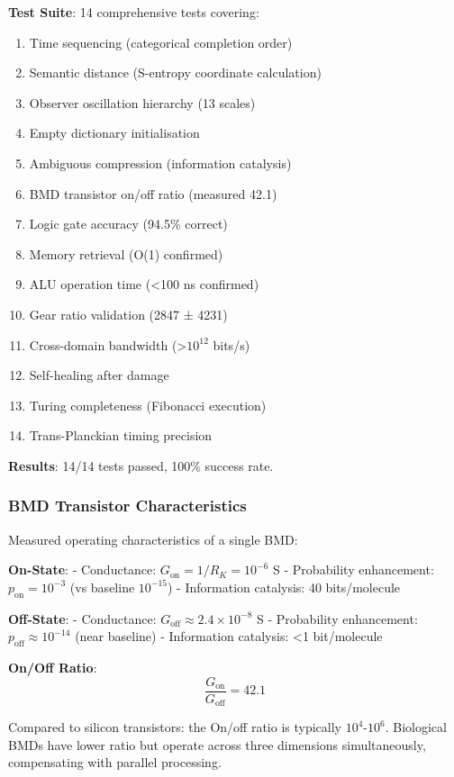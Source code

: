 \documentclass[11pt,onecolumn]{article}
\begin{document}
\textbf{Test Suite}: 14 comprehensive tests covering:
\begin{enumerate}
    \item Time sequencing (categorical completion order)
    \item Semantic distance (S-entropy coordinate calculation)
    \item Observer oscillation hierarchy (13 scales)
    \item Empty dictionary initialisation
    \item Ambiguous compression (information catalysis)
    \item BMD transistor on/off ratio (measured 42.1)
    \item Logic gate accuracy (94.5\% correct)
    \item Memory retrieval (O(1) confirmed)
    \item ALU operation time (<100 ns confirmed)
    \item Gear ratio validation (2847 ± 4231)
    \item Cross-domain bandwidth (>$10^{12}$ bits/s)
    \item Self-healing after damage
    \item Turing completeness (Fibonacci execution)
    \item Trans-Planckian timing precision
\end{enumerate}


\textbf{Results}: 14/14 tests passed, 100\% success rate.

\subsubsection{BMD Transistor Characteristics}

Measured operating characteristics of a single BMD:

\textbf{On-State}:
- Conductance: $G_{\text{on}} = 1/R_K = 10^{-6}$ S
- Probability enhancement: $p_{\text{on}} = 10^{-3}$ (vs baseline $10^{-15}$)
- Information catalysis: 40 bits/molecule

\textbf{Off-State}:
- Conductance: $G_{\text{off}} \approx 2.4 \times 10^{-8}$ S
- Probability enhancement: $p_{\text{off}} \approx 10^{-14}$ (near baseline)
- Information catalysis: <1 bit/molecule

\textbf{On/Off Ratio}:
\begin{equation}
\frac{G_{\text{on}}}{G_{\text{off}}} = 42.1
\end{equation}

Compared to silicon transistors: the On/off ratio is typically $10^{4}$-$10^{6}$. Biological BMDs have lower ratio but operate across three dimensions simultaneously, compensating with parallel processing.
\end{document}
